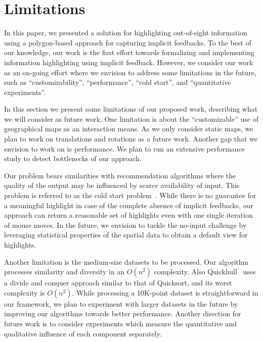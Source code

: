 \documentclass[sigconf,edbt]{acmart-edbt2019}
\begin{document}
\section{Limitations}
\label{sec:limitations}

 In this paper, we presented a solution for highlighting out-of-sight information using a polygon-based approach for capturing implicit feedbacks. To the best of our knowledge, our work is the first effort towards formalizing and implementing information highlighting using implicit feedback. However, we consider our work as an on-going effort where we envision to address some limitations in the future, such as ``customizability'', ``performance'', ``cold start'', and ``quantitative experiments''.
 
 \vspace{2pt}
In this section we present some limitations of our proposed work, describing what we will consider as future work. One limitation is about the ``customizable'' use of geographical maps as an interaction means. As we only consider static maps, we plan to work on translations and rotations as a future work. Another gap that we envision to work on is  performance. We plan to run an extensive performance study to detect bottlenecks of our approach.

\vspace{2pt}
Our problem bears similarities with recommendation algorithms where the quality of the output may be influenced by scarce availability of input. This problem is referred to as the cold start problem~\cite{LeroyCB10}. While there is no guarantee for a meaningful highlight in case of the complete absence of implicit feedbacks, our approach can return a reasonable set of highlights even with one single iteration of mouse moves. In the future, we envision to tackle the no-input challenge by leveraging statistical properties of the spatial data to obtain a default view for highlights.

\vspace{2pt}
Another limitation is the medium-size datasets to be processed. Our algorithm processes similarity and diversity in an $O(n^2)$ complexity. Also Quickhull~\cite{Barber:1996} uses a divide and conquer approach similar to that of Quicksort, and its worst complexity is $O(n^2)$. While processing a 10K-point dataset is straightforward in our framework, we plan to experiment with larger datasets in the future by improving our algorithms towards better performance. Another direction for future work is to consider experiments which measure the quantitative and qualitative influence of each component separately.  
\end{document}
